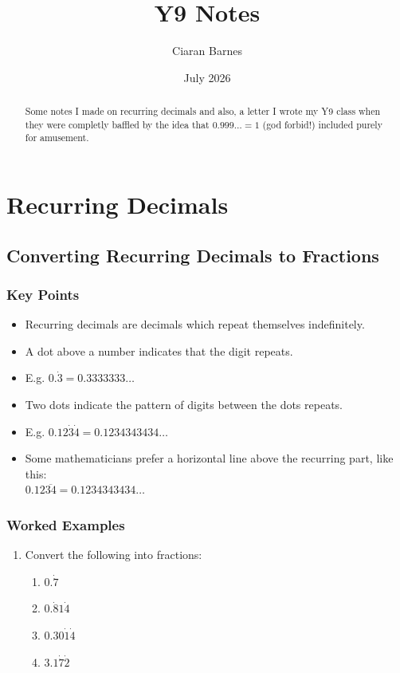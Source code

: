 \documentclass{article}
\title{Y9 Notes}
\author{Ciaran Barnes}
\date{July 2026}
\begin{document}
\maketitle
\begin{abstract}
    Some notes I made on recurring decimals and also, a letter I wrote my Y9 class when they were completly baffled by the idea that \(0.999 \dots =1\) (god forbid!) included purely for amusement.
\end{abstract}

\newpage

\section{Recurring Decimals}

\newpage

\subsection*{Converting Recurring Decimals to Fractions}

\subsubsection*{Key Points}

\begin{itemize}
    \item Recurring decimals are decimals which repeat themselves indefinitely.
    \item A dot above a number indicates that the digit repeats.
    \item E.g. $0.\dot{3}=0.3333333 \dots $
    \item Two dots indicate the pattern of digits between the dots repeats.
    \item E.g. $0.12\dot{3}\dot{4} = 0.1234343434 \dots $
    \item Some mathematicians prefer a horizontal line above the recurring part, like this: \\
    $0.12\overline{34} = 0.1234343434\dots$
\end{itemize}


\subsubsection*{Worked Examples}



    \begin{enumerate}
        \item Convert the following into fractions:
        \begin{enumerate}
            \item $0.\dot{7}$ \vspace{60mm}
            \item $0.\dot{8}1\dot{4}$ \vspace{60mm}
            \item $0.30\dot{1}\dot{4}$ \vspace{60mm}
            \item $3.1\dot{7}\dot{2}$
        \end{enumerate}
    \end{enumerate}
\end{document}

